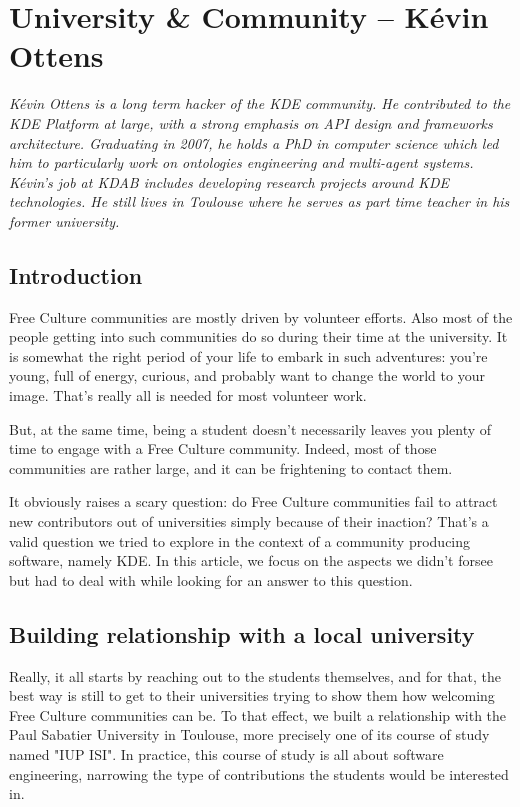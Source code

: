 \section{University \& Community -- Kévin Ottens}

\textit{Kévin Ottens is a long term hacker of the KDE community. He contributed to the KDE Platform at large, with a strong emphasis on API design and frameworks architecture. Graduating in 2007, he holds a PhD in computer science which led him to particularly work on ontologies engineering and multi-agent systems. Kévin's job at KDAB includes developing research projects around KDE technologies. He still lives in Toulouse where he serves as part time teacher in his former university.}

\subsection*{Introduction}
Free Culture communities are mostly driven by volunteer efforts. Also most of the people getting into such communities do so during their time at the university. It is somewhat the right period of your life to embark in such adventures: you're young, full of energy, curious, and probably want to change the world to your image. That's really all is needed for most volunteer work.

But, at the same time, being a student doesn't necessarily leaves you plenty of time to engage with a Free Culture community. Indeed, most of those communities are rather large, and it can be frightening to contact them.

It obviously raises a scary question: do Free Culture communities fail to attract new contributors out of universities simply because of their inaction? That's a valid question we tried to explore in the context of a community producing software, namely KDE. In this article, we focus on the aspects we didn't forsee but had to deal with while looking for an answer to this question.

\subsection*{Building relationship with a local university}
Really, it all starts by reaching out to the students themselves, and for that, the best way is still to get to their universities trying to show them how welcoming Free Culture communities can be. To that effect, we built a relationship with the Paul Sabatier University in Toulouse, more precisely one of its course of study named "IUP ISI". In practice, this course of study is all about software engineering, narrowing the type of contributions the students would be interested in.

